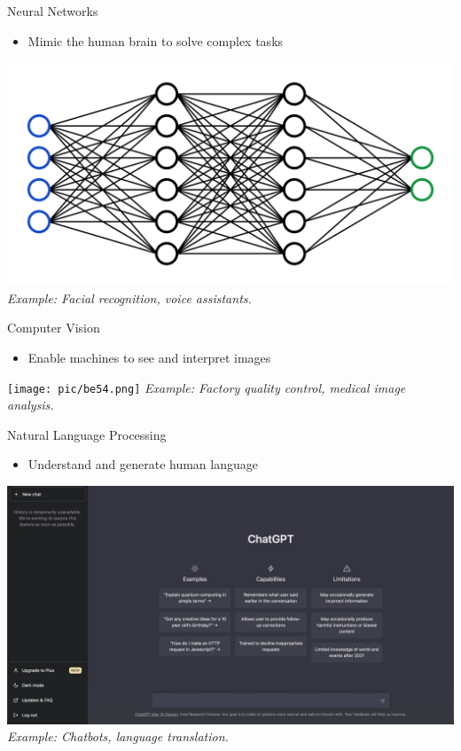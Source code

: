 \documentclass[serif, aspectratio=169]{beamer}
\begin{document}
\begin{frame}{Neural Networks}
    \begin{itemize}
        \item Mimic the human brain to solve complex tasks
    \end{itemize}
    \vspace{1cm}
    \includegraphics[width=\linewidth]{pic/be3.png}
    \vspace{0.5cm}
    \textit{Example: Facial recognition, voice assistants.}
\end{frame}

\begin{frame}{Computer Vision}
    \begin{itemize}
        \item Enable machines to see and interpret images
    \end{itemize}
    \vspace{1cm}
    \texttt{[image: pic/be54.png]} 
    \vspace{0.5cm}
    \textit{Example: Factory quality control, medical image analysis.}
\end{frame}

\begin{frame}{Natural Language Processing}
    \begin{itemize}
        \item Understand and generate human language
    \end{itemize}
    \vspace{1cm}
    \includegraphics[width=\linewidth]{pic/be5.jpg}
    \vspace{0.5cm}
    \textit{Example: Chatbots, language translation.}
\end{frame}
\end{document}

